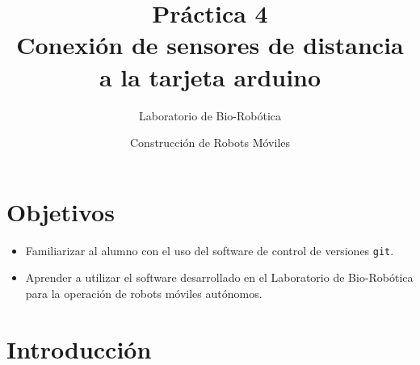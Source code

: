 \documentclass[letterpaper,12pt]{article}
\title{Práctica 4 \\ Conexión de sensores de distancia a la tarjeta arduino}
\author{Laboratorio de Bio-Robótica}
\date{Construcción de Robots Móviles}
\begin{document}
\renewcommand{\tablename}{Tabla}
\maketitle
\section*{Objetivos}
\begin{itemize}
\item Familiarizar al alumno con el uso del software de control de versiones \texttt{git}.
\item Aprender a utilizar el software desarrollado en el Laboratorio de Bio-Robótica para la operación de robots móviles autónomos. 
\end{itemize}

\section{Introducción}
\end{document}
